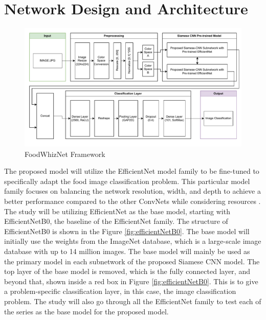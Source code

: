 \section{Network Design and Architecture}
\begin{figure}[h]
	\centering
	\includegraphics[width=1.0\textwidth]{graphics/images/Proposed_Model.pdf}
	\caption{FoodWhizNet Framework}
	\label{fig:proposedmodel}
\end{figure}

The proposed model will utilize the EfficientNet model family to be fine-tuned to specifically adapt the food image classification problem. This particular model family focuses on balancing the network resolution, width, and depth to achieve a better performance compared to the other ConvNets while considering resources \cite{ pmlr-v97-tan19a}. The study will be utilizing EfficientNet as the base model, starting with EfficientNetB0, the baseline of the EfficientNet family. The structure of EfficientNetB0 is shown in the Figure \ref{fig:efficientNetB0}. The base model will initially use the weights from the ImageNet database, which is a large-scale image database with up to 14 million images. The base model will mainly be used as the primary model in each subnetwork of the proposed Siamese CNN model. The top layer of the base model is removed, which is the fully connected layer, and beyond that, shown inside a red box in Figure \ref{fig:efficientNetB0}. This is to give a problem-specific classification layer, in this case, the image classification problem. The study will also go through all the EfficientNet family to test each of the series as the base model for the proposed model.

